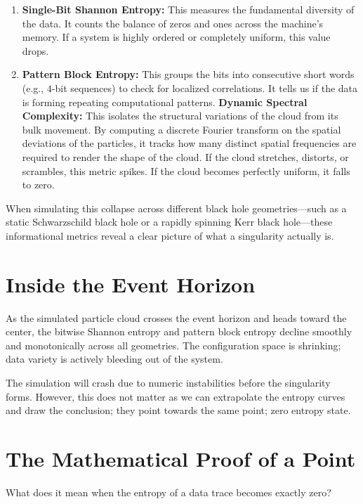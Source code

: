 \begin{enumerate}
\item \textbf{Single-Bit Shannon Entropy:} This measures the fundamental diversity of the data.
  It counts the balance of zeros and ones across the machine's memory.
  If a system is highly ordered or completely uniform, this value drops.
\item \textbf{Pattern Block Entropy:} This groups the bits into consecutive short words (e.g., $4$-bit sequences)
  to check for localized correlations.
  It tells us if the data is forming repeating computational patterns.
  \textbf{Dynamic Spectral Complexity:} This isolates the structural variations of the cloud from its bulk movement.
  By computing a discrete Fourier transform on the spatial deviations of the particles, it tracks how many distinct
  spatial frequencies are required to render the shape of the cloud.
  If the cloud stretches, distorts, or scrambles, this metric spikes. If the cloud becomes perfectly uniform,
  it falls to zero.
\end{enumerate}

When simulating this collapse across different black hole geometries—such as a static
Schwarzschild black hole or a rapidly spinning Kerr black hole—these informational metrics reveal a
clear picture of what a singularity actually is.

\section{Inside the Event Horizon}

As the simulated particle cloud crosses the event horizon and heads toward the center,
the bitwise Shannon entropy and pattern block entropy decline smoothly and monotonically across
all geometries. The configuration space is shrinking; data variety is actively bleeding out of the system.

The simulation will crash due to numeric instabilities before the singularity forms. However, this
does not matter as we can extrapolate the entropy curves and draw the conclusion; they point towards
the same point; zero entropy state.


\section{The Mathematical Proof of a Point}

What does it mean when the entropy of a data trace becomes exactly zero? 


